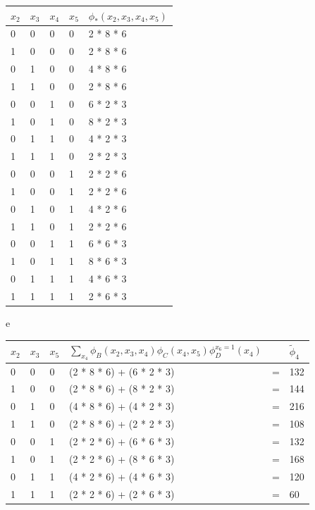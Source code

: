 \begin{exenumerate}
\begin{solution}
\begin{center}
\begin{tabular}{lllll}
                $x_2$ & $x_3$ & $x_4$& $x_5$ & $\phi_*(x_2,x_3,x_4,x_5)$\\
                \midrule
                0 & 0 & 0 & 0 & 2 * 8 * 6 \\
                1 & 0 & 0 & 0 & 2 * 8 * 6 \\
                0 & 1 & 0 & 0 & 4 * 8 * 6 \\
                1 & 1 & 0 & 0 & 2 * 8 * 6 \\
                0 & 0 & 1 & 0 & 6 * 2 * 3\\
                1 & 0 & 1 & 0 & 8 * 2 * 3\\
                0 & 1 & 1 & 0 & 4 * 2 * 3\\
                1 & 1 & 1 & 0 & 2 * 2 * 3\\
                0 & 0 & 0 & 1 & 2 * 2 * 6\\
                1 & 0 & 0 & 1 & 2 * 2 * 6\\
                0 & 1 & 0 & 1 & 4 * 2 * 6\\
                1 & 1 & 0 & 1 & 2 * 2 * 6\\
                0 & 0 & 1 & 1 & 6 * 6 * 3\\
                1 & 0 & 1 & 1 & 8 * 6 * 3\\
                0 & 1 & 1 & 1 & 4 * 6 * 3\\
                1 & 1 & 1 & 1 & 2 * 6 * 3\\
                \bottomrule
            \end{tabular}
        \end{center}
        e
        \begin{center}
            \begin{tabular}{llllll}
                \toprule
                $x_2$ & $x_3$ & $x_5$ & $\sum_{x_4} \phi_B(x_2, x_3, x_4) \phi_C(x_4, x_5) \phi_D^{x_6=1}(x_4)$ &  & $\tilde{\phi}_4$\\
                \midrule
                0 & 0 & 0 & (2 * 8 * 6) + (6 * 2 * 3) & = & 132 \\
                1 & 0 & 0 & (2 * 8 * 6) + (8 * 2 * 3) & = & 144 \\
                0 & 1 & 0 & (4 * 8 * 6) + (4 * 2 * 3) & = & 216 \\
                1 & 1 & 0 & (2 * 8 * 6) + (2 * 2 * 3) & = & 108 \\
                0 & 0 & 1 & (2 * 2 * 6) + (6 * 6 * 3) & = & 132 \\
                1 & 0 & 1 & (2 * 2 * 6) + (8 * 6 * 3) & = & 168 \\
                0 & 1 & 1 & (4 * 2 * 6) + (4 * 6 * 3) & = & 120 \\
                1 & 1 & 1 & (2 * 2 * 6) + (2 * 6 * 3) & = & 60 \\
                \bottomrule
            \end{tabular}
        \end{center}
        

\end{solution}
\end{exenumerate}
